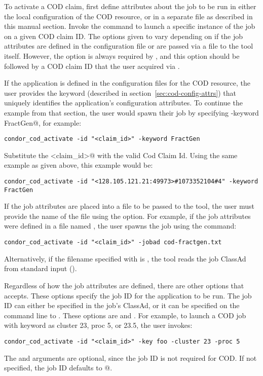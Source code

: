 To activate a COD claim, first define attributes about
the job to be run in either the local configuration of the COD
resource, or in a separate file as described in this manual section.
Invoke the
 command to launch a specific instance of the
job on a given COD claim ID.
The options given to  vary depending on if the
job attributes are defined in the configuration file or are
passed via a file to the  tool itself.
However, the  option is always required by
, and this option should be followed
by a COD claim ID that
the user acquired via .


If the application is defined in the configuration files for the COD
resource, the user provides the keyword (described in
section~\ref{sec:cod-config-attrs}) that uniquely identifies the
application's configuration attributes.
To continue the example from that section, the user would spawn their
job by specifying \verb@-keyword FractGen@, for example:
\begin{verbatim}
condor_cod_activate -id "<claim_id>" -keyword FractGen
\end{verbatim}
Substitute the \verb@<claim_id>@ with the valid Cod Claim Id.
Using the same example as given above, this example would be:
\footnotesize
\begin{verbatim}
condor_cod_activate -id "<128.105.121.21:49973>#1073352104#4" -keyword FractGen
\end{verbatim}
\normalsize

If the job attributes are placed into a file to be passed to the
 tool,
the user must provide the
name of the file using the  option.
For example, if the job attributes were defined in a file named
, the user spawns the job using the
command:
\begin{verbatim}
condor_cod_activate -id "<claim_id>" -jobad cod-fractgen.txt
\end{verbatim}
Alternatively, if the filename specified with  is
\File{-}, the  tool reads the job ClassAd from
standard input ().

Regardless of how the job attributes are defined, there are
other options that  accepts.
These options specify the job ID for the application to be run.
The job ID can either be specified in the job's ClassAd, 
or it can be
specified on the command line to .
These options are  and .
For example, to launch a COD job with keyword \verb@foo@
as cluster 23, proc 5, or 23.5,
the user invokes:
\begin{verbatim}
condor_cod_activate -id "<claim_id>" -key foo -cluster 23 -proc 5
\end{verbatim}
The  and  arguments are optional,
since the job ID is not required for COD.
If not specified, the job ID defaults to @.



